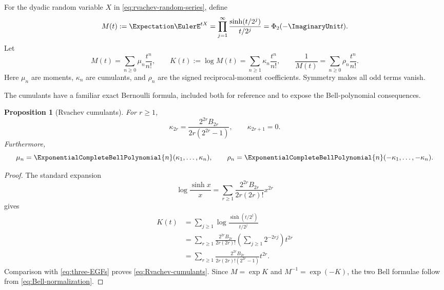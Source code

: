 \documentclass[11pt]{article}
\numberwithin{equation}{section}
\newtheorem{proposition}[theorem]{Proposition}
\theoremstyle{definition}
\theoremstyle{remark}
\begin{document}
For the dyadic random variable $X$ in \eqref{eq:rvachev-random-series}, define
\begin{equation}
 M(t):=\Expectation\EulerE^{tX}
 =\prod_{j=1}^{\infty}
 \frac{\sinh(t/2^j)}{t/2^j}
 =\Phi_2(-\ImaginaryUnit t).
 \label{eq:MGF}
\end{equation}
Let
\begin{equation}
 M(t)=\sum_{n\ge0}\mu_n\frac{t^n}{n!},
 \qquad
 K(t):=\log M(t)=\sum_{n\ge1}\kappa_n\frac{t^n}{n!},
 \qquad
 \frac1{M(t)}=\sum_{n\ge0}\rho_n\frac{t^n}{n!}.
 \label{eq:three-EGFs}
\end{equation}
Here $\mu_n$ are moments, $\kappa_n$ are cumulants, and $\rho_n$ are the
signed reciprocal-moment coefficients.  Symmetry makes all odd terms vanish.

The cumulants have a familiar exact Bernoulli formula, included both for
reference and to expose the Bell-polynomial consequences.

\begin{proposition}[Rvachev cumulants]
\label{prop:Rvachev-cumulants}
For $r\ge1$,
\begin{equation}
 \boxed{
 \kappa_{2r}=
 \frac{2^{2r}B_{2r}}{2r(2^{2r}-1)},
 \qquad \kappa_{2r+1}=0.}
 \label{eq:Rvachev-cumulants}
\end{equation}
Furthermore,
\begin{equation}
 \mu_n=\ExponentialCompleteBellPolynomial{n}(\kappa_1,\ldots,\kappa_n),
 \qquad
 \rho_n=\ExponentialCompleteBellPolynomial{n}(-\kappa_1,\ldots,-\kappa_n).
 \label{eq:moment-Bell}
\end{equation}
\end{proposition}
\begin{proof}
The standard expansion
\begin{equation}
 \log\frac{\sinh x}{x}
 =\sum_{r\ge1}
 \frac{2^{2r}B_{2r}}{2r(2r)!}x^{2r}
 \label{eq:logsinh-expansion}
\end{equation}
gives
\begin{align*}
 K(t)
 &=\sum_{j\ge1}\log\frac{\sinh(t/2^j)}{t/2^j}\\
 &=\sum_{r\ge1}
 \frac{2^{2r}B_{2r}}{2r(2r)!}
 \left(\sum_{j\ge1}2^{-2rj}\right)t^{2r}\\
 &=\sum_{r\ge1}
 \frac{2^{2r}B_{2r}}{2r(2r)!(2^{2r}-1)}t^{2r}.
\end{align*}
Comparison with \eqref{eq:three-EGFs} proves
\eqref{eq:Rvachev-cumulants}.  Since $M=\exp K$ and $M^{-1}=\exp(-K)$,
the two Bell formulae follow from \eqref{eq:Bell-normalization}.
\end{proof}
\end{document}
